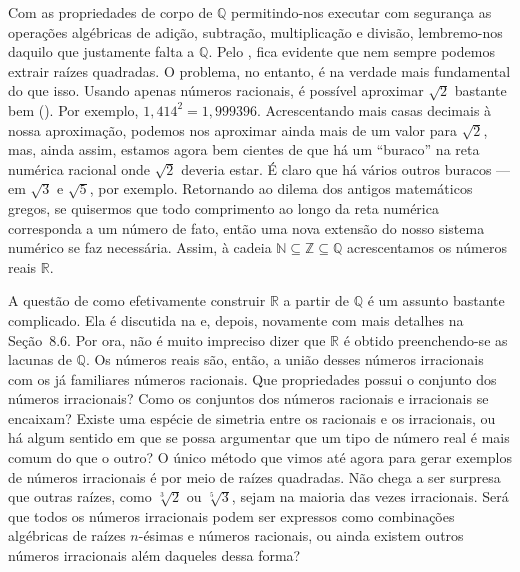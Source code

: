 Com as propriedades de corpo de $\mathbb{Q}$ permitindo-nos executar com segurança as operações algébricas de adição, subtração, multiplicação e divisão, lembremo-nos daquilo que justamente falta a $\mathbb{Q}$. Pelo , fica evidente que nem sempre podemos extrair raízes quadradas. O problema, no entanto, é na verdade mais fundamental do que isso. Usando apenas números racionais, é possível aproximar $\sqrt{2}$ bastante bem (). Por exemplo, $1{,}414^{2} = 1{,}999396$. Acrescentando mais casas decimais à nossa aproximação, podemos nos aproximar ainda mais de um valor para $\sqrt{2}$, mas, ainda assim, estamos agora bem cientes de que há um ``buraco'' na reta numérica racional onde $\sqrt{2}$ deveria estar. É claro que há vários outros buracos --- em $\sqrt{3}$ e $\sqrt{5}$, por exemplo. Retornando ao dilema dos antigos matemáticos gregos, se quisermos que todo comprimento ao longo da reta numérica corresponda a um número de fato, então uma nova extensão do nosso sistema numérico se faz necessária. Assim, à cadeia $\mathbb{N} \subseteq \mathbb{Z} \subseteq \mathbb{Q}$ acrescentamos os números reais $\mathbb{R}$.  

A questão de como efetivamente construir $\mathbb{R}$ a partir de $\mathbb{Q}$ é um assunto bastante complicado. Ela é discutida na  e, depois, novamente com mais detalhes na Seção~8.6. Por ora, não é muito impreciso dizer que $\mathbb{R}$ é obtido preenchendo-se as lacunas de $\mathbb{Q}$. Os números reais são, então, a união desses números irracionais com os já familiares números racionais. Que propriedades possui o conjunto dos números irracionais? Como os conjuntos dos números racionais e irracionais se encaixam? Existe uma espécie de simetria entre os racionais e os irracionais, ou há algum sentido em que se possa argumentar que um tipo de número real é mais comum do que o outro? O único método que vimos até agora para gerar exemplos de números irracionais é por meio de raízes quadradas. Não chega a ser surpresa que outras raízes, como $\sqrt[3]{2}$ ou $\sqrt[5]{3}$, sejam na maioria das vezes irracionais. Será que todos os números irracionais podem ser expressos como combinações algébricas de raízes $n$-ésimas e números racionais, ou ainda existem outros números irracionais além daqueles dessa forma? 


